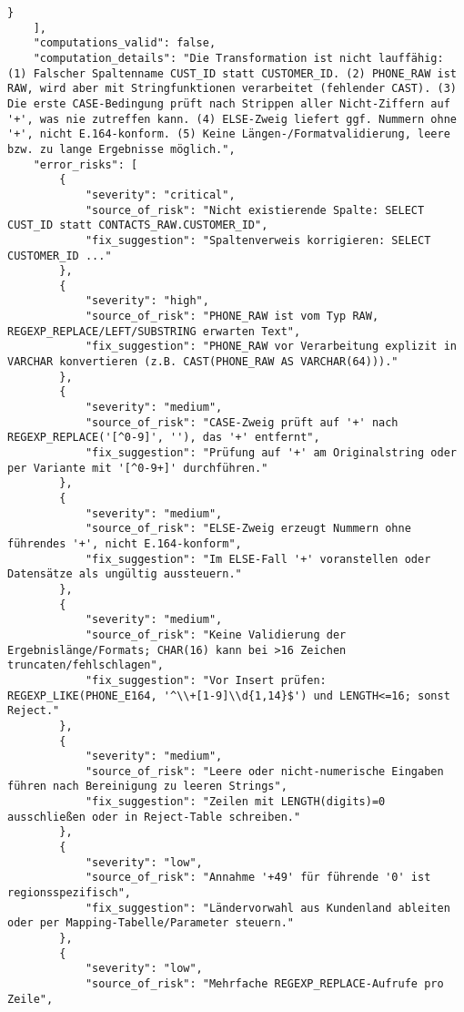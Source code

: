 \begin{lstlisting}[caption={Ausgabe: GPT-5 Anwendungsfall 3 Robustheitsdurchlauf},label={gpt_case3_prompt3}]
        }
    ],
    "computations_valid": false,
    "computation_details": "Die Transformation ist nicht lauffähig: (1) Falscher Spaltenname CUST_ID statt CUSTOMER_ID. (2) PHONE_RAW ist RAW, wird aber mit Stringfunktionen verarbeitet (fehlender CAST). (3) Die erste CASE-Bedingung prüft nach Strippen aller Nicht-Ziffern auf '+', was nie zutreffen kann. (4) ELSE-Zweig liefert ggf. Nummern ohne '+', nicht E.164-konform. (5) Keine Längen-/Formatvalidierung, leere bzw. zu lange Ergebnisse möglich.",
    "error_risks": [
        {
            "severity": "critical",
            "source_of_risk": "Nicht existierende Spalte: SELECT CUST_ID statt CONTACTS_RAW.CUSTOMER_ID",
            "fix_suggestion": "Spaltenverweis korrigieren: SELECT CUSTOMER_ID ..."
        },
        {
            "severity": "high",
            "source_of_risk": "PHONE_RAW ist vom Typ RAW, REGEXP_REPLACE/LEFT/SUBSTRING erwarten Text",
            "fix_suggestion": "PHONE_RAW vor Verarbeitung explizit in VARCHAR konvertieren (z.B. CAST(PHONE_RAW AS VARCHAR(64)))."
        },
        {
            "severity": "medium",
            "source_of_risk": "CASE-Zweig prüft auf '+' nach REGEXP_REPLACE('[^0-9]', ''), das '+' entfernt",
            "fix_suggestion": "Prüfung auf '+' am Originalstring oder per Variante mit '[^0-9+]' durchführen."
        },
        {
            "severity": "medium",
            "source_of_risk": "ELSE-Zweig erzeugt Nummern ohne führendes '+', nicht E.164-konform",
            "fix_suggestion": "Im ELSE-Fall '+' voranstellen oder Datensätze als ungültig aussteuern."
        },
        {
            "severity": "medium",
            "source_of_risk": "Keine Validierung der Ergebnislänge/Formats; CHAR(16) kann bei >16 Zeichen truncaten/fehlschlagen",
            "fix_suggestion": "Vor Insert prüfen: REGEXP_LIKE(PHONE_E164, '^\\+[1-9]\\d{1,14}$') und LENGTH<=16; sonst Reject."
        },
        {
            "severity": "medium",
            "source_of_risk": "Leere oder nicht-numerische Eingaben führen nach Bereinigung zu leeren Strings",
            "fix_suggestion": "Zeilen mit LENGTH(digits)=0 ausschließen oder in Reject-Table schreiben."
        },
        {
            "severity": "low",
            "source_of_risk": "Annahme '+49' für führende '0' ist regionsspezifisch",
            "fix_suggestion": "Ländervorwahl aus Kundenland ableiten oder per Mapping-Tabelle/Parameter steuern."
        },
        {
            "severity": "low",
            "source_of_risk": "Mehrfache REGEXP_REPLACE-Aufrufe pro Zeile",

\end{lstlisting}
